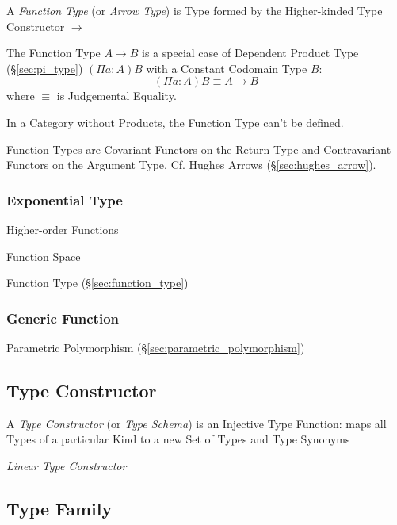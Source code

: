 A \emph{Function Type} (or \emph{Arrow Type}) is Type formed by the
Higher-kinded Type Constructor $\rightarrow$

The Function Type $A \rightarrow B$ is a special case of Dependent
Product Type (\S\ref{sec:pi_type}) $(\Pi a:A)B$ with a Constant
Codomain Type $B$:
\[
  (\Pi a:A)B \equiv A \rightarrow B
\]
where $\equiv$ is Judgemental Equality.

In a Category without Products, the Function Type can't be defined.

Function Types are Covariant Functors on the Return Type and
Contravariant Functors on the Argument Type. Cf. Hughes Arrows
(\S\ref{sec:hughes_arrow}).



\subsubsection{Exponential Type}\label{sec:exponential_type}

Higher-order Functions

Function Space

Function Type (\S\ref{sec:function_type})



\subsubsection{Generic Function}\label{sec:generic_function}

Parametric Polymorphism (\S\ref{sec:parametric_polymorphism})



\subsection{Type Constructor}\label{sec:type_constructor}

A \emph{Type Constructor} (or \emph{Type Schema}) is an Injective Type
Function: maps all Types of a particular Kind to a new Set of Types
and Type Synonyms

\emph{Linear Type Constructor} %



\subsection{Type Family}\label{sec:type_family}

